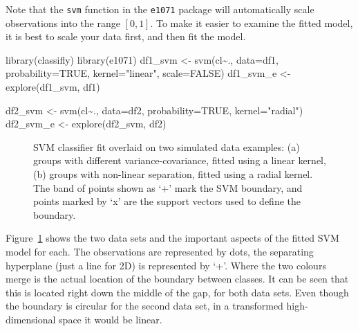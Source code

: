 \documentclass[
  letterpaper,
]{krantz}
\newenvironment{Shaded}{\begin{snugshade}}{\end{snugshade}}
\newcommand{\AttributeTok}[1]{\textcolor[rgb]{0.40,0.45,0.13}{#1}}
\newcommand{\ConstantTok}[1]{\textcolor[rgb]{0.56,0.35,0.01}{#1}}
\newcommand{\FunctionTok}[1]{\textcolor[rgb]{0.28,0.35,0.67}{#1}}
\newcommand{\NormalTok}[1]{\textcolor[rgb]{0.00,0.23,0.31}{#1}}
\newcommand{\OtherTok}[1]{\textcolor[rgb]{0.00,0.23,0.31}{#1}}
\newcommand{\SpecialCharTok}[1]{\textcolor[rgb]{0.37,0.37,0.37}{#1}}
\newcommand{\StringTok}[1]{\textcolor[rgb]{0.13,0.47,0.30}{#1}}
\begin{document}
Note that the \texttt{svm} function in the \texttt{e1071} package will
automatically scale observations into the range \([0,1]\). To make it
easier to examine the fitted model, it is best to scale your data first,
and then fit the model.

\begin{Shaded}
\begin{Highlighting}[]
\FunctionTok{library}\NormalTok{(classifly)}
\FunctionTok{library}\NormalTok{(e1071)}
\NormalTok{df1\_svm }\OtherTok{\textless{}{-}} \FunctionTok{svm}\NormalTok{(cl}\SpecialCharTok{\textasciitilde{}}\NormalTok{., }\AttributeTok{data=}\NormalTok{df1, }
                     \AttributeTok{probability=}\ConstantTok{TRUE}\NormalTok{, }
                     \AttributeTok{kernel=}\StringTok{"linear"}\NormalTok{, }
               \AttributeTok{scale=}\ConstantTok{FALSE}\NormalTok{)}
\NormalTok{df1\_svm\_e }\OtherTok{\textless{}{-}} \FunctionTok{explore}\NormalTok{(df1\_svm, df1)}

\NormalTok{df2\_svm }\OtherTok{\textless{}{-}} \FunctionTok{svm}\NormalTok{(cl}\SpecialCharTok{\textasciitilde{}}\NormalTok{., }\AttributeTok{data=}\NormalTok{df2,  }
                     \AttributeTok{probability=}\ConstantTok{TRUE}\NormalTok{, }
                     \AttributeTok{kernel=}\StringTok{"radial"}\NormalTok{)}
\NormalTok{df2\_svm\_e }\OtherTok{\textless{}{-}} \FunctionTok{explore}\NormalTok{(df2\_svm, df2)}
\end{Highlighting}
\end{Shaded}

\begin{figure}


\caption{\label{fig-svm-toy}SVM classifier fit overlaid on two simulated
data examples: (a) groups with different variance-covariance, fitted
using a linear kernel, (b) groups with non-linear separation, fitted
using a radial kernel. The band of points shown as `+' mark the SVM
boundary, and points marked by `x' are the support vectors used to
define the boundary.}

\end{figure}%

Figure~\ref{fig-svm-toy} shows the two data sets and the important
aspects of the fitted SVM model for each. The observations are
represented by dots, the separating hyperplane (just a line for 2D) is
represented by `+'. Where the two colours merge is the actual location
of the boundary between classes. It can be seen that this is located
right down the middle of the gap, for both data sets. Even though the
boundary is circular for the second data set, in a transformed
high-dimensional space it would be linear.
\end{document}
